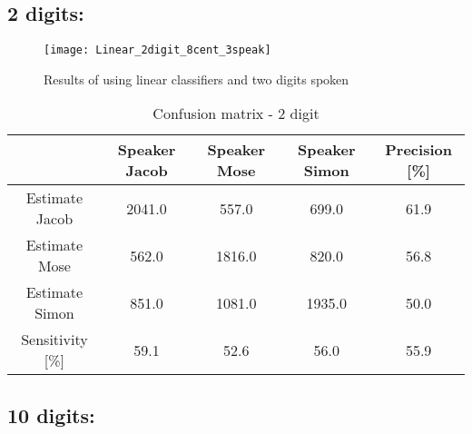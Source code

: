 \subsection{2 digits:}

\begin{figure}[H]
\centering
\texttt{[image: Linear\_2digit\_8cent\_3speak]}
\caption{Results of using linear classifiers and two digits spoken}
\label{fig:Lin_fig_2}
\end{figure}

\begin{table}[H]                                                    
\centering                                                          
\begin{tabular}{|c|c|c|c|c|}                                        
\hline                                                              
  & Speaker Jacob & Speaker Mose & Speaker Simon & Precision [\%] \\
\hline                                                              
Estimate Jacob & 2041.0 & 557.0 & 699.0 & 61.9 \\                   
\hline                                                              
Estimate Mose & 562.0 & 1816.0 & 820.0 & 56.8 \\                    
\hline                                                              
Estimate Simon & 851.0 & 1081.0 & 1935.0 & 50.0 \\                  
\hline                                                              
Sensitivity [\%] & 59.1 & 52.6 & 56.0 & 55.9 \\                     
\hline                                                              
\end{tabular}                                                       
\caption{Confusion matrix - 2 digit}                                
\label{table:Lin_conf_2}                                            
\end{table}                                


\subsection{10 digits:}

